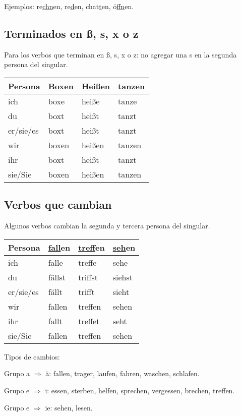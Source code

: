 Ejemplos: re\underline{chn}en, re\underline{d}en, chat\underline{t}en, ö\underline{ffn}en.

\subsection{Terminados en ß, s, x o z}
Para los verbos que terminan en ß, s, x o z: no agregar una s en la segunda persona del singular.

\begin{tabular}{| l | l l l|}
\hline
\textbf{Persona} & \textbf{\underline{Box}en}  & \textbf{\underline{Heiß}en}  & \textbf{\underline{tanz}en}\\
\hline
ich &  boxe & heiße & tanze \\
du &  boxt & heißt & tanzt \\
er/sie/es  & boxt & heißt & tanzt \\
wir & boxen & heißen & tanzen \\
ihr & boxt & heißt & tanzt \\
sie/Sie & boxen & heißen & tanzen \\
\hline
\end{tabular}

\subsection{Verbos que cambian}
Algunos verbos cambian la segunda y tercera persona del singular. 

\begin{tabular}{| l | l l l|}
\hline
\textbf{Persona} & \textbf{\underline{fall}en}  & \textbf{\underline{treff}en}  & \textbf{\underline{seh}en}\\
\hline
ich & falle & treffe & sehe \\
du &  fällst & triffst & siehst \\
er/sie/es  & fällt & trifft & sieht \\
wir & fallen & treffen & sehen \\
ihr & fallt & treffet & seht \\
sie/Sie & fallen & treffen & sehen \\
\hline
\end{tabular}

Tipos de cambios:
\begin{myitemize}
\item Grupo a $\Rightarrow$ ä: fallen, trager, laufen, fahren, waschen, schlafen.
\item Grupo e $\Rightarrow$ i: essen, sterben, helfen, sprechen, vergessen, brechen, treffen.
\item Grupo e $\Rightarrow$ ie: sehen, lesen.
\end{myitemize}


